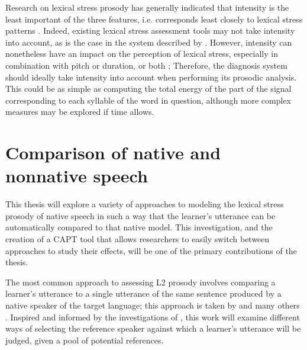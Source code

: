 		Research on lexical stress prosody has generally indicated that intensity is the least important of the three features, i.e. corresponds least closely to lexical stress patterns \citep{Cutler2005}. 
Indeed, existing lexical stress assessment tools may not take intensity into account, as is the case in the system described by \textcite{Bonneau2011}.  However, intensity can nonetheless have an impact on the perception of lexical stress, especially in combination with pitch or duration, or both \citep{Cutler2005}; %
Therefore, the diagnosis system should ideally take intensity into account when performing its prosodic analysis. This could be as simple as computing the total energy of the part of the signal corresponding to each syllable of the word in question, although more complex measures may be explored if time allows.
	
\section{Comparison of native and nonnative speech}
\label{sec:diag:compare}

	This thesis will explore a variety of approaches to modeling the lexical stress prosody of native speech in such a way that the learner's utterance can be automatically compared to that native model. This investigation, and the creation of a CAPT tool that allows researchers to easily switch between approaches to study their effects, will be one of the primary contributions of the thesis.
	
	
	The most common approach to assessing L2 prosody involves comparing a learner's utterance to a single utterance of the same sentence produced by a native speaker of the target language; this approach is taken by \textcite{Bonneau2011} and many others \citep{Eskenazi2009, Delmonte2011}. %
	 Inspired and informed by the investigations of \textcite{Probst2002}, this work will examine different ways of selecting the reference speaker against which a learner's utterance will be judged, given a pool of potential references. 
	
